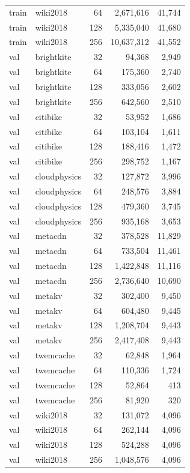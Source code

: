 \begin{longtable}{llrrr}
train & wiki2018 & 64 & 2,671,616 & 41,744 \\
train & wiki2018 & 128 & 5,335,040 & 41,680 \\
train & wiki2018 & 256 & 10,637,312 & 41,552 \\
val & brightkite & 32 & 94,368 & 2,949 \\
val & brightkite & 64 & 175,360 & 2,740 \\
val & brightkite & 128 & 333,056 & 2,602 \\
val & brightkite & 256 & 642,560 & 2,510 \\
val & citibike & 32 & 53,952 & 1,686 \\
val & citibike & 64 & 103,104 & 1,611 \\
val & citibike & 128 & 188,416 & 1,472 \\
val & citibike & 256 & 298,752 & 1,167 \\
val & cloudphysics & 32 & 127,872 & 3,996 \\
val & cloudphysics & 64 & 248,576 & 3,884 \\
val & cloudphysics & 128 & 479,360 & 3,745 \\
val & cloudphysics & 256 & 935,168 & 3,653 \\
val & metacdn & 32 & 378,528 & 11,829 \\
val & metacdn & 64 & 733,504 & 11,461 \\
val & metacdn & 128 & 1,422,848 & 11,116 \\
val & metacdn & 256 & 2,736,640 & 10,690 \\
val & metakv & 32 & 302,400 & 9,450 \\
val & metakv & 64 & 604,480 & 9,445 \\
val & metakv & 128 & 1,208,704 & 9,443 \\
val & metakv & 256 & 2,417,408 & 9,443 \\
val & twemcache & 32 & 62,848 & 1,964 \\
val & twemcache & 64 & 110,336 & 1,724 \\
val & twemcache & 128 & 52,864 & 413 \\
val & twemcache & 256 & 81,920 & 320 \\
val & wiki2018 & 32 & 131,072 & 4,096 \\
val & wiki2018 & 64 & 262,144 & 4,096 \\
val & wiki2018 & 128 & 524,288 & 4,096 \\
val & wiki2018 & 256 & 1,048,576 & 4,096 \\
\end{longtable}
